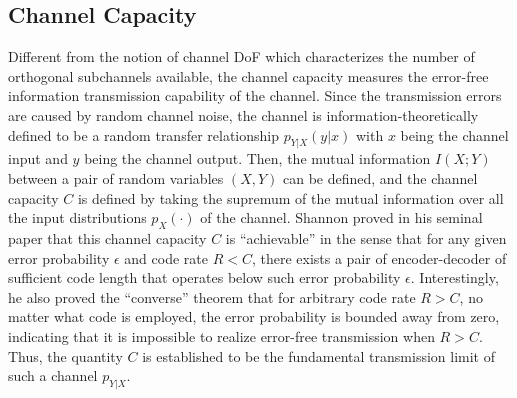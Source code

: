 \documentclass[journal,twocolumn]{IEEEtran}
\begin{document}


\subsection{Channel Capacity}
\label{Sec_2_Subsec_2}
Different from the notion of channel DoF which characterizes the number of orthogonal subchannels available, the channel capacity measures the error-free information transmission capability of the channel. 
Since the transmission errors are caused by random channel noise, the channel is information-theoretically defined to be a random transfer relationship $p_{Y|X}(y|x)$ with $x$ being the channel input and $y$ being the channel output. 
Then, the mutual information $I(X; Y)$ between a pair of random variables $(X, Y)$ can be defined, and the channel capacity $C$ is defined by taking the supremum of the mutual information over all the input distributions $p_X(\cdot)$ of the channel. Shannon proved in his seminal paper \cite{shannon1948mathematical} that this channel capacity $C$ is ``achievable'' in the sense that for any given error probability $\epsilon$ and code rate $R<C$, there exists a pair of encoder-decoder of sufficient code length that operates below such error probability $\epsilon$. 
Interestingly, he also proved the ``converse'' theorem that for arbitrary code rate $R>C$, no matter what code is employed, the error probability is bounded away from zero, indicating that it is impossible to realize error-free transmission when $R>C$. Thus, the quantity $C$ is established to be the fundamental transmission limit of such a channel $p_{Y|X}$. 
\end{document}
